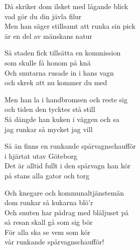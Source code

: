 Då skriker dom ilsket med lågande blick\\
vad gör du din jävla filur\\
Men han säger stillsamt att runka sin pick\\
är en del av mänskans natur\par
\vspace{10pt}
Så staden fick tillsätta en kommission\\
som skulle få honom på knä\\
Och snutarna rusade in i hans vagn\\
och skrek att nu kommer du med\par
\vspace{10pt}
Men han la i handbromsen och reste sig\\
och tiden den tycktes stå still\\
Så dängde han kuken i väggen och sa\\
jag runkar så mycket jag vill\par
\vspace{10pt}
Så än finns en runkande spårvagnschaufför\\
i hjärtat utav Göteborg\\
Det är alltid fullt i den spårvagn han kör\\
på stans alla gator och torg\par
\vspace{10pt}
Och knegare och kommunaltjänstemän\\
dom runkar så kukarna blö’r \\
Och snuten har pådrag med blåljuset på\\
så resan skall gå som sig bör\\
För alla ska se vem som kör\\
vår runkande spårvagnschaufför!

